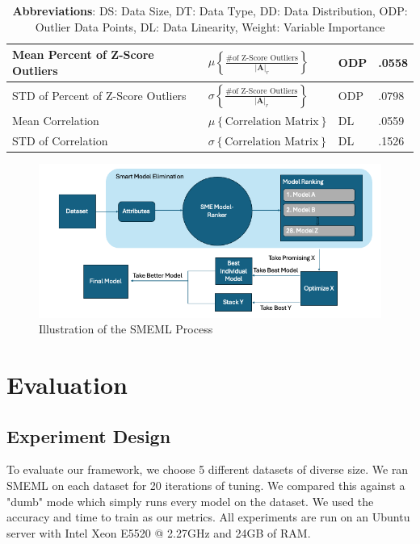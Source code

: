 \documentclass{article}
\begin{document}
\begin{table}
\begin{tabular}{llll}
    \hline
    Mean Percent of Z-Score Outliers  & 
    $\mu \left\{ \frac{\text{\# of Z-Score Outliers}}{|\mathbf{A}|_r} \right\}$ & ODP & .0558 \\
    \hline
    STD of Percent of Z-Score Outliers  &
    $\sigma \left\{ \frac{\text{\# of Z-Score Outliers}}{|\mathbf{A}|_r} \right\}$ & ODP & .0798 \\
    \hline
    Mean Correlation& $\mu \left\{\text{Correlation Matrix}\right\}$ & DL & .0559 \\
    \hline
    STD of Correlation & $\sigma \left\{\text{Correlation Matrix}\right\}$ & DL & .1526 \\
    \bottomrule
  \end{tabular}
  \captionsetup{font=footnotesize}
  \caption*{\textbf{Abbreviations}: DS: Data Size, DT: Data Type, DD: Data Distribution, ODP: Outlier Data Points, DL: Data Linearity, Weight: Variable Importance}
\end{table}


\begin {figure}
\centering
\includegraphics[width=\textwidth]{smeml-flowchart.png}
\caption{Illustration of the SMEML Process}
\end{figure}

\section{Evaluation}
\subsection{Experiment Design}
To evaluate our framework, we choose 5 different datasets of diverse size. We ran SMEML on each dataset for 20 iterations of tuning. We compared this against a "dumb" mode which simply runs every model on the dataset. We used the accuracy and time to train as our metrics. All experiments are run on an Ubuntu server with Intel Xeon E5520 @ 2.27GHz and 24GB of RAM.
\end{document}

